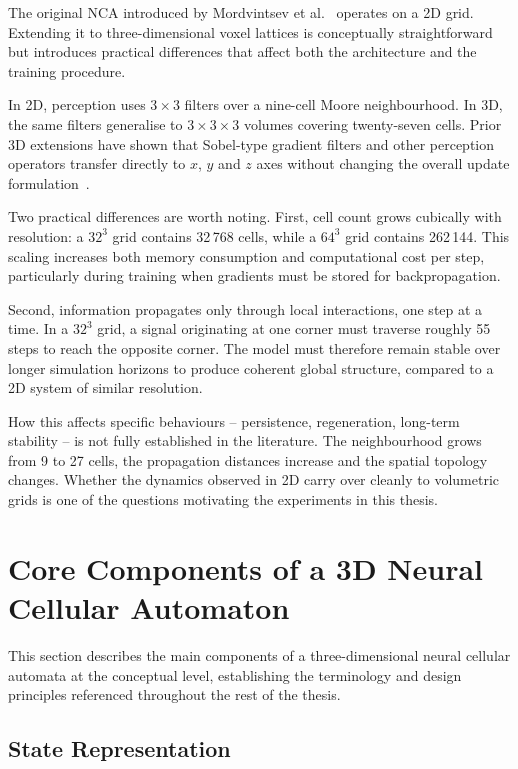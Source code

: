 The original NCA introduced by Mordvintsev et al.~\cite{Mordvintsev2020} operates on a 2D grid.
Extending it to three-dimensional voxel lattices is conceptually straightforward but
introduces practical differences that affect both the architecture and the training
procedure.

In 2D, perception uses $3 \times 3$ filters over a nine-cell Moore neighbourhood. In
3D, the same filters generalise to $3 \times 3 \times 3$ volumes covering twenty-seven
cells. Prior 3D extensions have shown that Sobel-type gradient filters and other
perception operators transfer directly to $x$, $y$ and $z$ axes without changing the
overall update formulation~\cite{Sudhakaran2021, Rossi2021, Aadityaza2024}.

Two practical differences are worth noting. First, cell count grows cubically with
resolution: a $32^3$ grid contains 32\,768 cells, while a $64^3$ grid contains
262\,144. This scaling increases both memory consumption and computational cost per
step, particularly during training when gradients must be stored for backpropagation.

Second, information propagates only through local interactions, one step at a time.
In a $32^3$ grid, a signal originating at one corner must traverse roughly 55 steps
to reach the opposite corner. The model must therefore remain stable over longer
simulation horizons to produce coherent global structure, compared to a 2D system of
similar resolution.

How this affects specific behaviours -- persistence, regeneration, long-term
stability -- is not fully established in the literature. The neighbourhood grows from
9 to 27 cells, the propagation distances increase and the spatial topology changes.
Whether the dynamics observed in 2D carry over cleanly to volumetric grids is one of
the questions motivating the experiments in this thesis.

\section{Core Components of a 3D Neural Cellular Automaton}
\label{sec:core-components}

This section describes the main components of a three-dimensional neural cellular
automata at the conceptual level, establishing the terminology and design principles
referenced throughout the rest of the thesis.

\subsection{State Representation}

